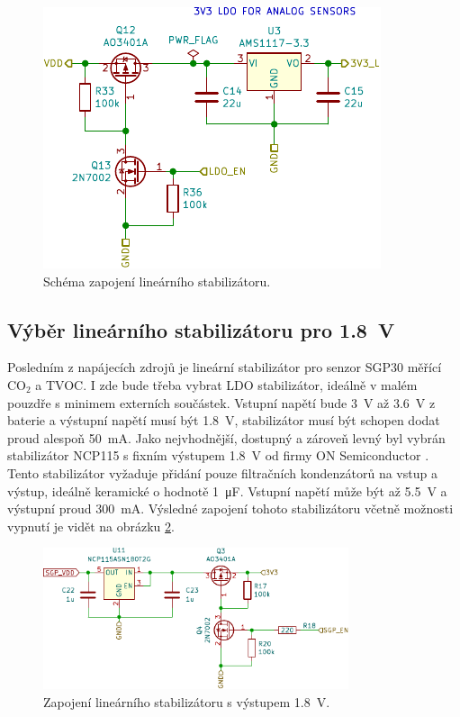 \begin{figure}[h]
    \centering
    \includegraphics{obrazky/ldo-schematic.pdf}
    \caption{Schéma zapojení lineárního stabilizátoru.}
    \label{fig_LDO-schematic}
\end{figure}

\subsection{Výběr lineárního stabilizátoru pro \SI{1.8}{\volt}}

Posledním z napájecích zdrojů je lineární stabilizátor pro senzor SGP30 měřící CO$_2$ a TVOC. I zde bude třeba vybrat LDO stabilizátor, ideálně v malém pouzdře s minimem externích součástek. Vstupní napětí bude \SI{3}{\volt} až \SI{3.6}{\volt} z baterie a výstupní napětí musí být \SI{1.8}{\volt}, stabilizátor musí být schopen dodat proud alespoň \SI{50}{\milli\ampere}. Jako nejvhodnější, dostupný a zároveň levný byl vybrán stabilizátor NCP115 s fixním výstupem \SI{1.8}{\volt} od firmy ON Semiconductor \cite{dat_NCP115}. Tento stabilizátor vyžaduje přidání pouze filtračních kondenzátorů na vstup a výstup, ideálně keramické o hodnotě \SI{1}{\micro\farad}. Vstupní napětí může být až \SI{5.5}{\volt} a výstupní proud \SI{300}{\milli\ampere}. Výsledné zapojení tohoto stabilizátoru včetně možnosti vypnutí je vidět na obrázku \ref{fig_LDO1.8-schematic}.

\begin{figure}[h]
    \centering
    \includegraphics[width=0.8\textwidth]{obrazky/ldo18-schematic.pdf}
    \caption{Zapojení lineárního stabilizátoru s výstupem \SI{1.8}{\volt}.}
    \label{fig_LDO1.8-schematic}
\end{figure}



